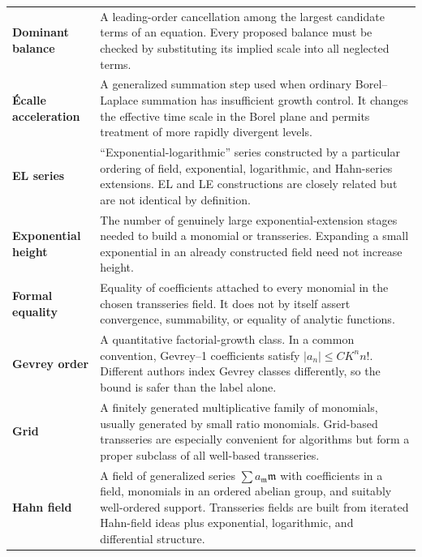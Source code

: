 \documentclass[11pt,openany]{book}
\theoremstyle{definition}
\theoremstyle{plain}
\theoremstyle{remark}
\newcommand{\m}{\mathfrak{m}}
\begin{document}
\begin{longtable}{@{}p{}p{}@{}}
\textbf{Dominant balance}\index{dominant balance}
& A leading-order cancellation among the largest candidate terms of an
equation. Every proposed balance must be checked by substituting its implied
scale into all neglected terms.\\

\textbf{Écalle acceleration}\index{acceleration}
& A generalized summation step used when ordinary Borel--Laplace summation has
insufficient growth control. It changes the effective time scale in the
Borel plane and permits treatment of more rapidly divergent levels.\\

\textbf{EL series}\index{EL series}
& ``Exponential-logarithmic'' series constructed by a particular ordering of
field, exponential, logarithmic, and Hahn-series extensions. EL and LE
constructions are closely related but are not identical by definition.\\

\textbf{Exponential height}\index{exponential height}
& The number of genuinely large exponential-extension stages needed to build
a monomial or transseries. Expanding a small exponential in an already
constructed field need not increase height.\\

\textbf{Formal equality}\index{formal equality}
& Equality of coefficients attached to every monomial in the chosen
transseries field. It does not by itself assert convergence, summability, or
equality of analytic functions.\\

\textbf{Gevrey order}\index{Gevrey order}
& A quantitative factorial-growth class. In a common convention, Gevrey--1
coefficients satisfy $|a_n|\le C K^n n!$. Different authors index Gevrey
classes differently, so the bound is safer than the label alone.\\

\textbf{Grid}\index{grid}
& A finitely generated multiplicative family of monomials, usually generated
by small ratio monomials. Grid-based transseries are especially convenient
for algorithms but form a proper subclass of all well-based transseries.\\

\textbf{Hahn field}\index{Hahn field}
& A field of generalized series $\sum a_\m\m$ with coefficients in a field,
monomials in an ordered abelian group, and suitably well-ordered support.
Transseries fields are built from iterated Hahn-field ideas plus exponential,
logarithmic, and differential structure.\\


\end{longtable}
\end{document}
